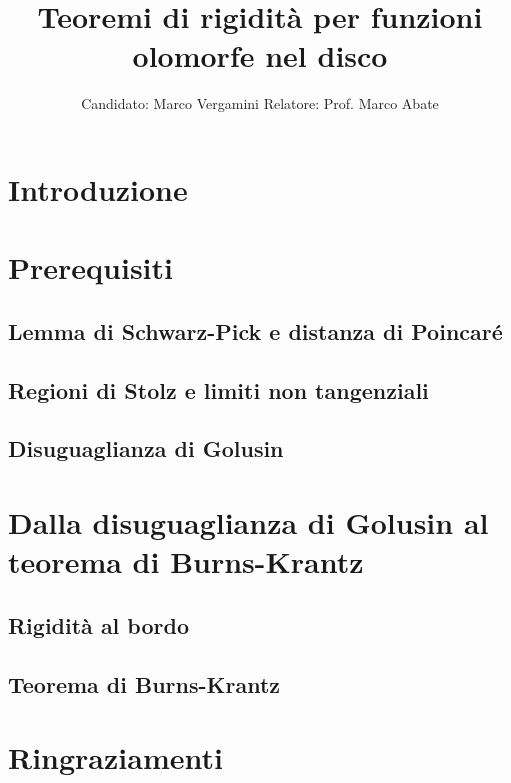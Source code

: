 \documentclass{article}
\title{Teoremi di rigidità per funzioni olomorfe nel disco}
\date{}
\author{Candidato: Marco Vergamini \qquad Relatore: Prof. Marco Abate}
\begin{document}
\maketitle
\newpage
\tableofcontents
\newpage


\section*{Introduzione}


\newpage

\section{Prerequisiti}

\subsection{Lemma di Schwarz-Pick e distanza di Poincaré}


\subsection{Regioni di Stolz e limiti non tangenziali}


\subsection{Disuguaglianza di Golusin}


\newpage

\section{Dalla disuguaglianza di Golusin al teorema di Burns-Krantz}

\subsection{Rigidità al bordo}


\subsection{Teorema di Burns-Krantz}


\newpage



\section*{Ringraziamenti}

\end{document}
